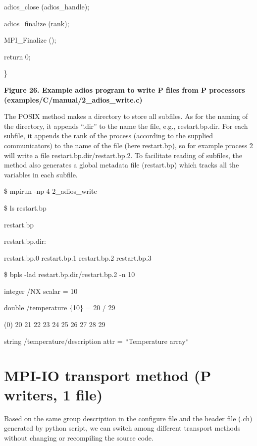 {\color{color02} adios\_close (adios\_handle);}

{\color{color02} adios\_finalize (rank);}

MPI\_Finalize ();

return 0;

\leftskip=0pt
\}

\label{HRef119579429}\label{HToc144350185}

\begin{center}
{\color{color20} \textbf{Figure 26. Example adios program to write P files from 
P processors (examples/C/manual/2\_adios\_write.c)}}
\end{center}

The POSIX method makes a directory to store all subfiles. As for the naming of 
the directory, it appends ``.dir'' to the name the file, e.g., restart.bp.dir. 
For each subfile, it appends the rank of the process (according to the supplied 
communicators) to the name of the file (here restart.bp), so for example process 
2 will write a file restart.bp.dir/restart.bp.2. To facilitate reading of subfiles, 
the method also generates a global metadata file (restart.bp) which tracks all 
the variables in each subfile. 

\$ mpirun -np 4 2\_adios\_write

\$ ls restart.bp

restart.bp

restart.bp.dir:

restart.bp.0  restart.bp.1  restart.bp.2  restart.bp.3

\$ bpls -lad restart.bp.dir/restart.bp.2 -n 10

\parindent=7pt
integer    /NX                       scalar = 10 

double     /temperature              \{10\} = 20 / 29 

\parindent=14pt
(0)    20 21 22 23 24 25 26 27 28 29 

\parindent=0pt
string     /temperature/description  attr   = \texttt{"}Temperature array\texttt{"}\label{HToc84890296}\label{HToc212016672}\label{HToc212016914}\label{HToc182553444}

\section{MPI-IO transport method (P writers, 1 file)}

Based on the same group description in the configure file and the header file (.ch) 
generated by python script, we can switch among different transport methods without 
changing or recompiling the source code.

